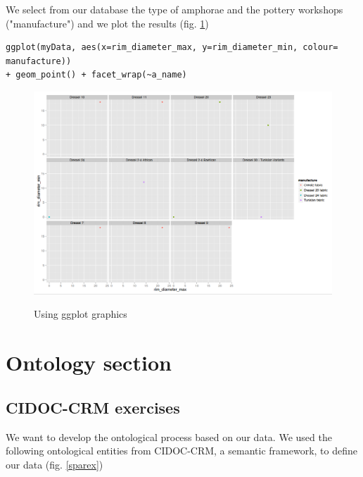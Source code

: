 \documentclass[10pt,a4paper]{article}
\begin{document}
We select from our database the type of amphorae and the pottery workshops ("manufacture") and we plot the results (fig. \ref{ggplotex})

\begin{verbatim}
ggplot(myData, aes(x=rim_diameter_max, y=rim_diameter_min, colour= manufacture)) 
+ geom_point() + facet_wrap(~a_name)
\end{verbatim}


\begin{figure}[hdp]
\centering
\includegraphics[scale=0.30]{ggplot2ex.png}
\label{ggplotex}
\caption{Using ggplot graphics}
\end{figure}


\section{Ontology section}

\subsection{CIDOC-CRM exercises}

We want to develop the ontological process based on our data. We used the following ontological entities from CIDOC-CRM, a semantic framework, to define our data  (fig. \ref{sparex})
\end{document}
